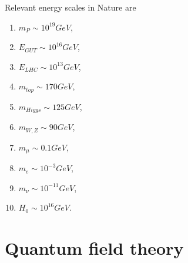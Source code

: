     Relevant energy scales in Nature are 
    \begin{enumerate}
        \item $m_P \sim 10^{19} GeV$, 
        \item $E_{GUT} \sim 10^{16} GeV$, 
        \item $E_{LHC}\sim 10^{13} GeV$, 
        \item $m_{top} \sim 170 GeV$, 
        \item $m_{Higgs} \sim 125 GeV$, 
        \item $m_{W, Z} \sim 90 GeV$, 
        \item $m_{\mu} \sim 0.1 GeV$, 
        \item $m_{e} \sim 10^{-3} GeV$, 
        \item $m_{\nu} \sim 10^{-11} GeV$, 
        \item $H_0 \sim 10^{16} GeV$.
    \end{enumerate}

\section{Quantum field theory}

